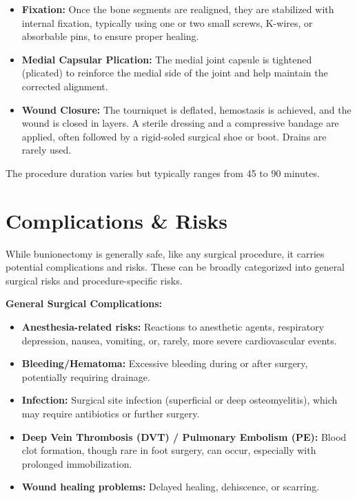 \begin{itemize}
\begin{itemize}
      \item \textit{Akin Osteotomy:} A medial closing wedge osteotomy of the proximal phalanx may be performed to correct any residual hallux valgus interphalangeus.
    \end{itemize}
  \item \textbf{Fixation:} Once the bone segments are realigned, they are stabilized with internal fixation, typically using one or two small screws, K-wires, or absorbable pins, to ensure proper healing.
  \item \textbf{Medial Capsular Plication:} The medial joint capsule is tightened (plicated) to reinforce the medial side of the joint and help maintain the corrected alignment.
  \item \textbf{Wound Closure:} The tourniquet is deflated, hemostasis is achieved, and the wound is closed in layers. A sterile dressing and a compressive bandage are applied, often followed by a rigid-soled surgical shoe or boot. Drains are rarely used.
\end{itemize}
The procedure duration varies but typically ranges from 45 to 90 minutes.

\section*{Complications \& Risks}
While bunionectomy is generally safe, like any surgical procedure, it carries potential complications and risks. These can be broadly categorized into general surgical risks and procedure-specific risks.

\textbf{General Surgical Complications:}
\begin{itemize}
  \item \textbf{Anesthesia-related risks:} Reactions to anesthetic agents, respiratory depression, nausea, vomiting, or, rarely, more severe cardiovascular events.
  \item \textbf{Bleeding/Hematoma:} Excessive bleeding during or after surgery, potentially requiring drainage.
  \item \textbf{Infection:} Surgical site infection (superficial or deep osteomyelitis), which may require antibiotics or further surgery.
  \item \textbf{Deep Vein Thrombosis (DVT) / Pulmonary Embolism (PE):} Blood clot formation, though rare in foot surgery, can occur, especially with prolonged immobilization.
  \item \textbf{Wound healing problems:} Delayed healing, dehiscence, or scarring.
\end{itemize}


